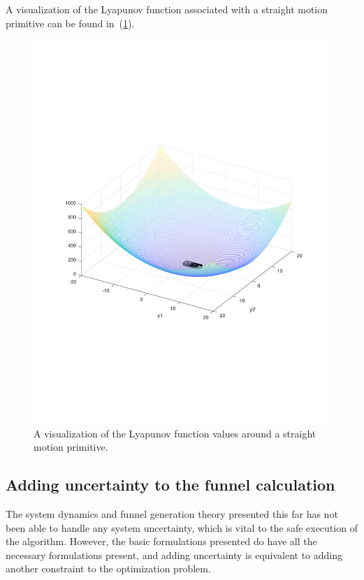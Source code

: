 A visualization of the Lyapunov function associated with a straight motion
primitive can be found in~(\ref{fig:visualized-lyapunov}).
\begin{figure}
  \centering
  \includegraphics[scale=.3]{figures/rrtfunnel/straight-funnel-lyapunov-3d}
  \caption{A visualization of the Lyapunov function values around a straight
    motion primitive.}
  \label{fig:visualized-lyapunov}
\end{figure}

\subsection{Adding uncertainty to the funnel calculation}
\label{sec:adding-uncertainty}

The system dynamics and funnel generation theory presented this far has not been
able to handle any system uncertainty, which is vital to the safe execution of
the \rrtfunnel{} algorithm. However, the basic formulations presented do have
all the necessary formulations present, and adding uncertainty is equivalent to
adding another constraint to the optimization problem.

